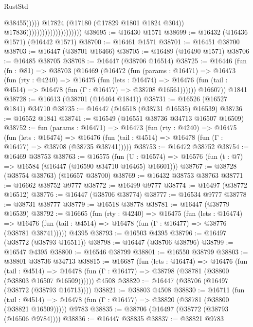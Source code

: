 \begin{lexlean}{RustStd}
\begin{coremodule}
                                                        @38455)))))
                                              @17824
                                              (@17180 (@17829 @1801 @1824 @304))
                                              @17836)))))))))))))))))))))
@38695 := @16430 @1571
@38699 := @16432 (@16436 @1571) (@16442 @1571)
@38700 := @16461 @1571
@38701 := @16451 @38700
@38703 := @16447 (@38701 @16466)
@38705 := @16489 (@16490 @1571)
@38706 := @16485 @38705
@38708 := @16447 (@38706 @16514)
@38725 := @16446
    (fun (fn : @81) =>
    @38703
      (@16469
        (@16472
          (fun (params : @16471) =>
          @16473
            (fun (rty : @4240) =>
            @16475
              (fun (lets : @16474) =>
              @16476 (fun (tail : @4514) => @16478 (fun (Γ : @16477) => @38708 @16561))))))
        @16607))
    @1841
@38728 := @16613 (@38701 (@16464 @1841))
@38731 := @16526 (@16527 @1841) @34710
@38735 := @16447 (@16518 (@38731 @16535) @16539)
@38736 := @16552 @1841
@38741 := @16549 (@16551 @38736 @34713 @16507 @16509)
@38752 := fun (params : @16471) =>
  @16473
    (fun (rty : @4240) =>
    @16475
      (fun (lets : @16474) =>
      @16476 (fun (tail : @4514) => @16478 (fun (Γ : @16477) => @38708 (@38735 @38741)))))
@38753 := @16472 @38752
@38754 := @16469 @38753
@38763 := @16575
    (fun (U : @16574) => @16576 (fun (t : @7) => @16584 (@16447 (@16590 @34710 @16465) @16601)))
@38767 := @38728 (@38754 @38763) (@16657 @38700)
@38769 := @16432 @38753 @38763
@38771 := @16662 @38752 @9777
@38772 := @16499 @9777
@38774 := @16497 (@38772 @16512)
@38776 := @16447 (@38706 @38774)
@38777 := @16534 @9777
@38778 := @38731 @38777
@38779 := @16518 @38778
@38781 := @16447 (@38779 @16539)
@38792 := @16665
    (fun (rty : @4240) =>
    @16475
      (fun (lets : @16474) =>
      @16476 (fun (tail : @4514) => @16478 (fun (Γ : @16477) => @38776 (@38781 @38741)))))
    @4395
@38793 := @16503 @4395
@38796 := @16497 (@38772 (@38793 @16511))
@38798 := @16447 (@38706 @38796)
@38799 := @16547 @4395
@38800 := @16546 @38799
@38801 := @16550 @38799
@38803 := @38801 @38736 @34713
@38815 := @16687
    (fun (lets : @16474) =>
    @16476
      (fun (tail : @4514) =>
      @16478 (fun (Γ : @16477) => @38798 (@38781 (@38800 (@38803 @16507 @16509))))))
    @4508
@38820 := @16447 (@38706 (@16497 (@38772 (@38793 @16713))))
@38821 := @38803 @4508
@38830 := @16711
    (fun (tail : @4514) => @16478 (fun (Γ : @16477) => @38820 (@38781 (@38800 (@38821 @16509)))))
    @9783
@38835 := @38706 (@16497 (@38772 (@38793 (@16506 @9784))))
@38836 := @16447 @38835
@38837 := @38821 @9783

\end{coremodule}
\end{lexlean}
